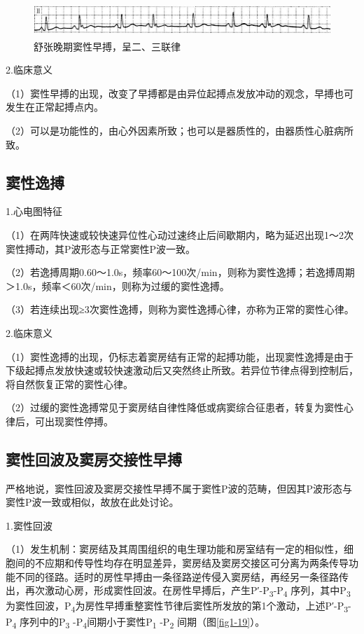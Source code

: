 \begin{figure}[!htbp]
 \centering
 \includegraphics[width=5.78125in,height=0.51042in]{./images/Image00024.jpg}
 \captionsetup{justification=centering}
 \caption{舒张晚期窦性早搏，呈二、三联律}
 \label{fig1-18}
  \end{figure} 

2.临床意义

（1）窦性早搏的出现，改变了早搏都是由异位起搏点发放冲动的观念，早搏也可发生在正常起搏点内。

（2）可以是功能性的，由心外因素所致；也可以是器质性的，由器质性心脏病所致。

\protect\hypertarget{text00007.htmlux5cux23subid17}{}{}

\subsection{窦性逸搏}

1.心电图特征

（1）在两阵快速或较快速异位性心动过速终止后间歇期内，略为延迟出现1～2次窦性搏动，其P波形态与正常窦性P波一致。

（2）若逸搏周期0.60～1.0s，频率60～100次/min，则称为窦性逸搏；若逸搏周期＞1.0s，频率＜60次/min，则称为过缓的窦性逸搏。

（3）若连续出现≥3次窦性逸搏，则称为窦性逸搏心律，亦称为正常的窦性心律。

2.临床意义

（1）窦性逸搏的出现，仍标志着窦房结有正常的起搏功能，出现窦性逸搏是由于下级起搏点发放快速或较快速激动后又突然终止所致。若异位节律点得到控制后，将自然恢复正常的窦性心律。

（2）过缓的窦性逸搏常见于窦房结自律性降低或病窦综合征患者，转复为窦性心律后，可出现窦性停搏。

\protect\hypertarget{text00007.htmlux5cux23subid18}{}{}

\subsection{窦性回波及窦房交接性早搏}

严格地说，窦性回波及窦房交接性早搏不属于窦性P波的范畴，但因其P波形态与窦性P波一致或相似，故放在此处讨论。

1.窦性回波

（1）发生机制：窦房结及其周围组织的电生理功能和房室结有一定的相似性，细胞间的不应期和传导性均存在明显差异，窦房结及窦房交接区可分离为两条传导功能不同的径路。适时的房性早搏由一条径路逆传侵入窦房结，再经另一条径路传出，再次激动心房，形成窦性回波。在房性早搏后，产生P′-P\textsubscript{3}-P\textsubscript{4} 序列，其中P\textsubscript{3}为窦性回波，P\textsubscript{4}为房性早搏重整窦性节律后窦性所发放的第1个激动，上述P′-P\textsubscript{3}-P\textsubscript{4} 序列中的P\textsubscript{3} -P\textsubscript{4}间期小于窦性P\textsubscript{1} -P\textsubscript{2} 间期（图\ref{fig1-19}）。

